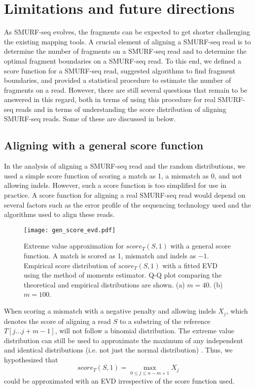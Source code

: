 \section{Limitations and future directions}
As SMURF-seq evolves, the fragments can be expected to get shorter
challenging the existing mapping tools. A crucial element of aligning a
SMURF-seq read is to determine the number of fragments on a SMURF-seq
read and to determine the optimal fragment boundaries on a SMURF-seq
read. To this end, we defined a score function for a SMURF-seq read,
suggested algorithms to find fragment boundaries, and provided a
statistical procedure to estimate the number of fragments on a read.
%
However, there are still several questions that remain to be answered in
this regard, both in terms of using this procedure for real SMURF-seq
reads and in terms of understanding the score distribution of aligning
SMURF-seq reads. Some of these are discussed in below.


\subsection*{Aligning with a general score function}
In the analysis of aligning a SMURF-seq read and the random
distributions, we used a simple score function of scoring a match as 1,
a mismatch as 0, and not allowing indels. However, such a score function
is too simplified for use in practice. A score function for aligning a
real SMURF-seq read would depend on several factors such as the error
profile of the sequencing technology used and the algorithms used to
align these reads.

\begin{figure}[b!]
\centering
\texttt{[image: gen\_score\_evd.pdf]}
\caption[Extreme value approximation for $score_T(S,1)$ with a general
  score function]{
  Extreme value approximation for $score_T(S,1)$ with a general score
  function. A match is scored as 1, mismatch and indels as $-1$.
  Empirical score distribution of $score_T(S,1)$ with a fitted
  EVD using the method of moments estimator.
  Q-Q plot comparing the theoretical and empirical distributions are shown.
  (a) $m=40$.
  (b) $m=100$.}
\label{gen_score_evd}
\end{figure}

When scoring a mismatch with a negative penalty and allowing indels
$X_j$, which denotes the score of aligning a read $S$ to a substring of
the reference $T[j \dots j+m-1]$, will not follow a binomial
distribution.
%
The extreme value distribution can still be used to approximate the
maximum of any independent and identical distributions (i.e. not just
the normal distribution) \citep{kotz2000extreme}.  Thus, we hypothesized
that \[score_T(S,1) = \max_{0 \leq j \leq n-m+1} X_j\]  could be
approximated with an EVD irrespective of the score function used.

